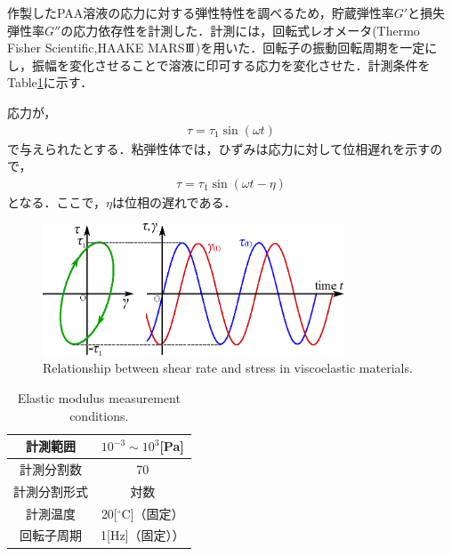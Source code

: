 作製したPAA溶液の応力に対する弾性特性を調べるため，貯蔵弾性率$G'$と損失弾性率$G''$の応力依存性を計測した．計測には，回転式レオメータ(Thermo Fisher Scientific,HAAKE MARS$\rm I\hspace{-.15em}I\hspace{-.15em}I$)を用いた．回転子の振動回転周期を一定にし，振幅を変化させることで溶液に印可する応力を変化させた．計測条件をTable\ref{table:elastic}に示す．

応力が，
\begin{eqnarray}
    \tau=\tau_1\sin\left(\omega{}t\right)
\end{eqnarray}
で与えられたとする．粘弾性体では，ひずみは応力に対して位相遅れを示すので，
\begin{eqnarray}
    \tau=\tau_1\sin\left(\omega{}t-\eta\right)
\end{eqnarray}
となる．ここで，$\eta$は位相の遅れである．

\begin{figure}[ht]
    \centering
    \includegraphics[width=0.8\textwidth]{2-Methods/elasticity.eps}
    \caption{Relationship between shear rate and stress in viscoelastic materials.}
    \label{fig:elastic}
\end{figure}

\begin{table}[ht]
    \centering
    \caption{Elastic modulus measurement conditions.}
    \label{table:elastic}
    \begin{tabular}{c|c}\hline
        計測範囲     & $10^{-3} \sim 10^3$[Pa] \\ \hline
        計測分割数   & 70                      \\ \hline
        計測分割形式 & 対数                    \\ \hline
        計測温度     & 20[$^\circ$C]（固定）   \\ \hline
        回転子周期   & 1[Hz]（固定））         \\ \hline
    \end{tabular}
\end{table}

